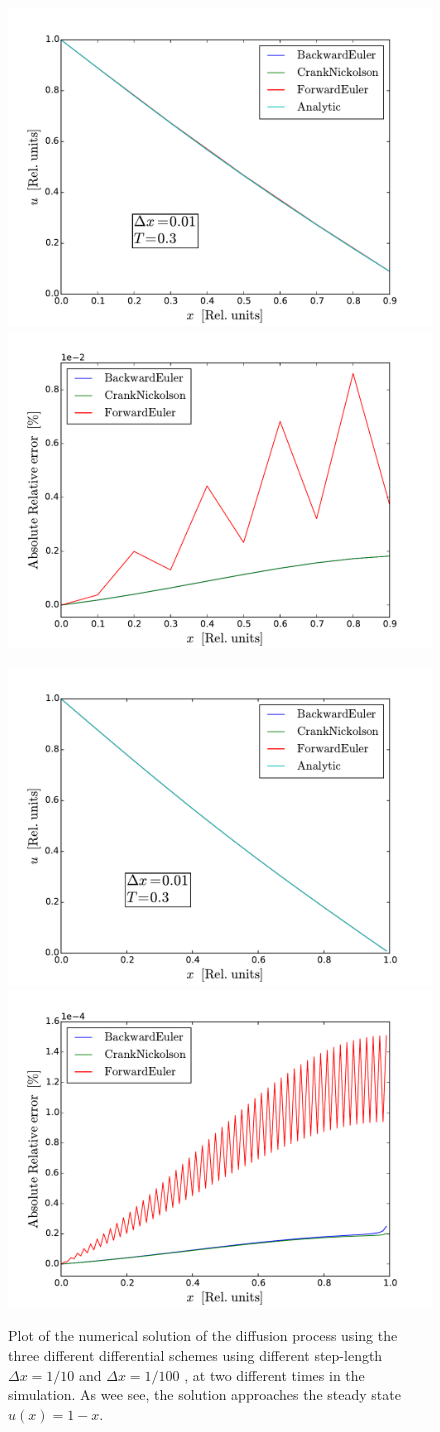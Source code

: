 \documentclass[twoside, 11pt]{article}
\begin{document}
{\begin{figure}
			\includegraphics[width=0.49\linewidth, clip=true, trim=0 5 0 29]{Figures/FYS3150_project_5_differential_dx01_linear.pdf}%
			\includegraphics[width=0.49\linewidth, clip=true, trim=0 5 0 29]{Figures/FYS3150_project_5_differential_error_dx01_linear.pdf}

			\includegraphics[width=0.49\linewidth, clip=true, trim=0 5 0 29]{Figures/FYS3150_project_5_differential_dx001_linear.pdf}%
			\includegraphics[width=0.49\linewidth, clip=true, trim=0 5 0 29]{Figures/FYS3150_project_5_differential_error_dx001_linear.pdf}
			
			\caption{Plot of the numerical solution of the diffusion process using the three different differential schemes using different step-length $\Delta x=1/10$ and $\Delta x = 1/100$ , at two different times in the simulation. As wee see, the solution approaches the steady state $u(x) = 1-x$.}
			\label{fig: differentials all results}
		\end{figure}}
		
\end{document}
